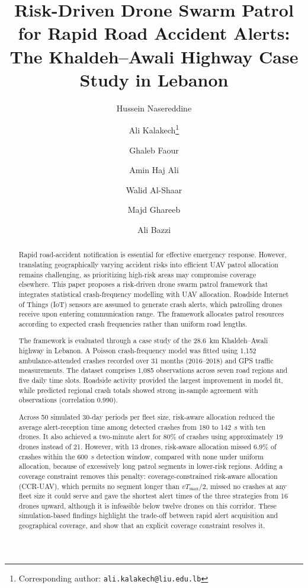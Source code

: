 \documentclass[11pt]{article}
\title{Risk-Driven Drone Swarm Patrol for Rapid Road Accident Alerts:
The Khaldeh--Awali Highway Case Study in Lebanon}
\author[1]{Hussein Nasereddine}
\author[1]{Ali Kalakech\thanks{Corresponding author:
\texttt{ali.kalakech@liu.edu.lb}}}
\author[2]{Ghaleb Faour}
\author[1]{Amin Haj Ali}
\author[3]{Walid Al-Shaar}
\author[1]{Majd Ghareeb}
\author[1]{Ali Bazzi}
\affil[1]{Computer and Communication Engineering Department,
School of Engineering, Lebanese International University,
Beirut, Lebanon}
\affil[2]{National Center for Remote Sensing,
National Council for Scientific Research of Lebanon
(CNRS-L), Beirut, Lebanon}
\affil[3]{Novum Research and Innovation Group,
Beirut, Lebanon}
\date{}
\begin{document}
\maketitle

\begin{abstract}
Rapid road-accident notification is essential for effective emergency response.
However, translating geographically varying accident risks into efficient UAV
patrol allocation remains challenging, as prioritizing high-risk areas may
compromise coverage elsewhere. This paper proposes a risk-driven drone swarm
patrol framework that integrates statistical crash-frequency modelling with UAV
allocation. Roadside Internet of Things (IoT) sensors are assumed to generate
crash alerts, which patrolling drones receive upon entering communication
range. The framework allocates patrol resources according to expected crash
frequencies rather than uniform road lengths.

The framework is evaluated through a case study of the 28.6~km Khaldeh--Awali
highway in Lebanon. A Poisson crash-frequency model was fitted using 1{,}152
ambulance-attended crashes recorded over 31 months (2016--2018) and GPS traffic
measurements. The dataset comprises 1{,}085 observations across seven road
regions and five daily time slots. Roadside activity provided the largest
improvement in model fit, while predicted regional crash totals showed strong
in-sample agreement with observations (correlation 0.990).

Across 50 simulated 30-day periods per fleet size, risk-aware allocation
reduced the average alert-reception time among detected crashes from 180 to
142~s with ten drones. It also achieved a two-minute alert for 80\% of crashes
using approximately 19 drones instead of 21. However, with 13 drones,
risk-aware allocation missed 6.9\% of crashes within the 600~s detection window,
compared with none under uniform allocation, because of excessively long patrol
segments in lower-risk regions. Adding a coverage constraint removes this
penalty: coverage-constrained risk-aware allocation (CCR-UAV), which permits
no segment longer than $vT_{\max}/2$, missed no crashes at any fleet size it
could serve and gave the shortest alert times of the three strategies from 16
drones upward, although it is infeasible below twelve drones on this corridor.
These simulation-based findings highlight the trade-off between rapid alert
acquisition and geographical coverage, and show that an explicit coverage
constraint resolves it.
\end{abstract}
\end{document}
